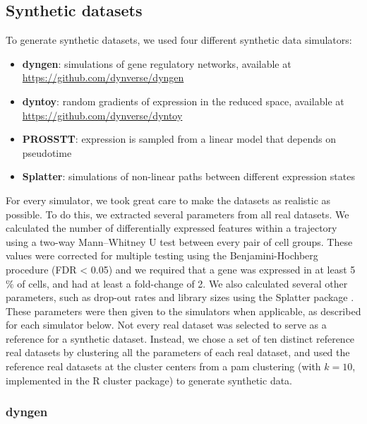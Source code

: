 \subsection{Synthetic datasets}

To generate synthetic datasets, we used four different synthetic data simulators:

\begin{itemize}
	\item \textbf{dyngen}: simulations of gene regulatory networks, available at \url{https://github.com/dynverse/dyngen}
	\item \textbf{dyntoy}: random gradients of expression in the reduced space, available at \url{https://github.com/dynverse/dyntoy}
	\item \textbf{PROSSTT}: expression is sampled from a linear model that depends on pseudotime \cite{papadopoulos_prossttprobabilisticsimulation_2018}
	\item \textbf{Splatter}: simulations of non-linear paths between different expression states \cite{zappia_splattersimulationsinglecell_2017}
\end{itemize}


For every simulator, we took great care to make the datasets as realistic as possible. To do this, we extracted several parameters from all real datasets. We calculated the number of differentially expressed features within a trajectory using a two-way Mann–Whitney U test between every pair of cell groups. These values were corrected for multiple testing using the Benjamini-Hochberg procedure (FDR < 0.05) and we required that a gene was expressed in at least 5$\%$ of cells, and had at least a fold-change of 2. We also calculated several other parameters, such as drop-out rates and library sizes using the Splatter package \cite{zappia_splattersimulationsinglecell_2017}. These parameters were then given to the simulators when applicable, as described for each simulator below. Not every real dataset was selected to serve as a reference for a synthetic dataset. Instead, we chose a set of ten distinct reference real datasets by clustering all the parameters of each real dataset, and used the reference real datasets at the cluster centers from a pam clustering (with $k = 10$, implemented in the R cluster package) to generate synthetic data.

\subsubsection{dyngen}


